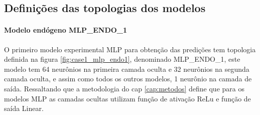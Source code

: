     \subsection{Definições das topologias dos modelos}
        \paragraph{Modelo endógeno MLP\_ENDO\_1}
            O primeiro modelo experimental MLP para obtenção das predições tem topologia definida na figura \ref{fig:case1_mlp_endo1}, denominado MLP\_ENDO\_1, este modelo tem 64 neurônios na primeira camada oculta e 32 neurônios na segunda camada oculta, e assim como todos os outros modelos, 1 neurônio na camada de saída. Ressaltando que a metodologia do cap \ref{cap:metodos} define que para os modelos MLP as camadas ocultas utilizam função de ativação ReLu e função de saída Linear.
            \begin{figure}[H]
            \end{figure}
            
